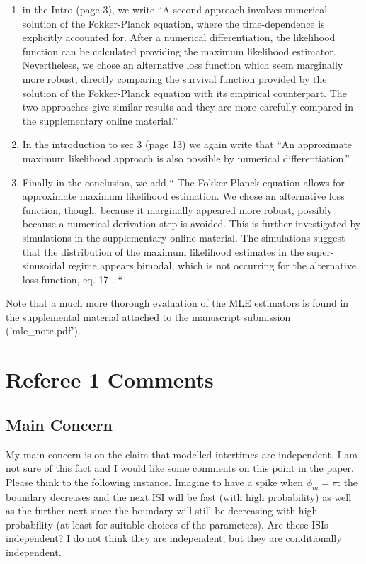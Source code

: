 \documentclass{article}
\begin{document}
\begin{enumerate}
  \item in the Intro (page 3), we write ``A second approach involves numerical solution of the Fokker-Planck
equation, where the time-dependence is explicitly accounted for. After a
numerical differentiation, the likelihood function can be calculated providing
the maximum likelihood estimator. Nevertheless, we chose an alternative loss
function which seem marginally more robust, directly comparing the survival
function provided by the solution of the Fokker-Planck equation with its
empirical counterpart. The two approaches give similar results and they are more
carefully compared in the supplementary online material.''

\item In the introduction to sec 3 (page 13) we again write that ``An approximate maximum likelihood approach is also possible by numerical
differentiation.''

\item Finally in the conclusion, we add ``
The Fokker-Planck equation allows for approximate maximum likelihood
estimation. We chose an alternative loss function, though, because it
marginally appeared more robust, possibly because a numerical derivation
step is avoided. This is further investigated by simulations in the
supplementary online material. The simulations suggest that the
distribution of the maximum likelihood estimates in the super-sinusoidal
regime appears bimodal, which is not occurring for the alternative loss
function, eq. 17	. ``
\end{enumerate}

Note that a much more thorough evaluation of the MLE estimators is found in the
supplemental material attached to the manuscript submission ('mle\_note.pdf').

\section{Referee 1 Comments}

\subsection{Main Concern}
My main concern is on the claim that modelled intertimes are independent. I am
not sure of this fact and I would like some comments on this point in the paper.
Please think to the following instance. Imagine to have a spike when $\phi_m =
\pi$: the boundary decreases and the next ISI will be fast (with high
probability) as well as the further next since the boundary will still be
decreasing with high probability (at least for suitable choices of the
parameters). Are these ISIs independent? I do not think they are independent,
but they are conditionally independent.
\end{document}
